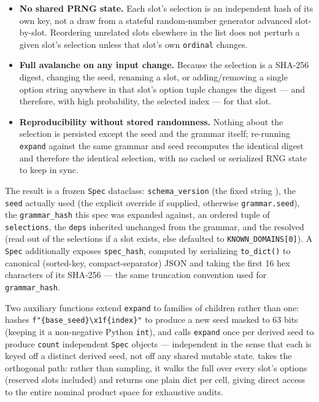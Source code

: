 \documentclass[
]{article}
\providecommand{\tightlist}{%
  \setlength{\itemsep}{0pt}\setlength{\parskip}{0pt}}
\begin{document}
\begin{itemize}
\tightlist
\item
  \textbf{No shared PRNG state.} Each slot's selection is an independent
  hash of its own key, not a draw from a stateful random-number
  generator advanced slot-by-slot. Reordering unrelated slots elsewhere
  in the list does not perturb a given slot's selection unless that
  slot's own \texttt{ordinal} changes.
\item
  \textbf{Full avalanche on any input change.} Because the selection is
  a SHA-256 digest, changing the seed, renaming a slot, or
  adding/removing a single option string anywhere in that slot's option
  tuple changes the digest --- and therefore, with high probability, the
  selected index --- for that slot.
\item
  \textbf{Reproducibility without stored randomness.} Nothing about the
  selection is persisted except the seed and the grammar itself;
  re-running \texttt{expand} against the same grammar and seed
  recomputes the identical digest and therefore the identical selection,
  with no cached or serialized RNG state to keep in sync.
\end{itemize}

The result is a frozen \texttt{Spec} dataclass: \texttt{schema\_version}
(the fixed string ), the \texttt{seed}
actually used (the explicit override if supplied, otherwise
\texttt{grammar.seed}), the \texttt{grammar\_hash} this spec was
expanded against, an ordered tuple of
 \texttt{selections}, the
\texttt{deps} inherited unchanged from the grammar, and the resolved
 (read out of the selections if a
 slot exists, else defaulted to
\texttt{KNOWN\_DOMAINS{[}0{]}}). A \texttt{Spec} additionally exposes
\texttt{spec\_hash}, computed by serializing \texttt{to\_dict()} to
canonical (sorted-key, compact-separator) JSON and taking the first 16
hex characters of its SHA-256 --- the same truncation convention used
for \texttt{grammar\_hash}.

Two auxiliary functions extend \texttt{expand} to families of children
rather than one:  hashes
\texttt{f"\{base\_seed\}\textbackslash{}x1f\{index\}"} to produce a new
seed masked to 63 bits (keeping it a non-negative Python \texttt{int}),
and  calls
\texttt{expand} once per derived seed to produce \texttt{count}
independent \texttt{Spec} objects --- independent in the sense that each
is keyed off a distinct derived seed, not off any shared mutable state.
 takes the orthogonal path: rather than
sampling, it walks the full  over every slot's
options (reserved slots included) and returns one plain dict per cell,
giving direct access to the entire nominal product space for exhaustive
audits.
\end{document}
